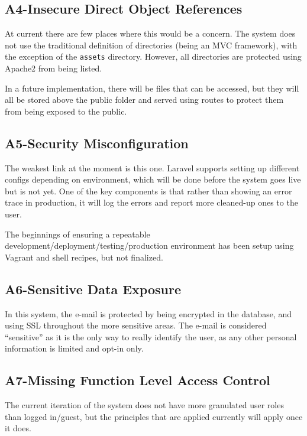 \subsection{A4-Insecure Direct Object References}

At current there are few places where this would be a concern. The
system does not use the traditional definition of directories (being an
MVC framework), with the exception of the \texttt{assets} directory.
However, all directories are protected using Apache2 from being listed.

In a future implementation, there will be files that can be accessed,
but they will all be stored above the public folder and served using
routes to protect them from being exposed to the public.

\subsection{A5-Security Misconfiguration}

The weakest link at the moment is this one. Laravel supports setting up
different configs depending on environment, which will be done before
the system goes live but is not yet. One of the key components is that
rather than showing an error trace in production, it will log the errors
and report more cleaned-up ones to the user.

The beginnings of ensuring a repeatable
development/deployment/testing/production environment has been setup
using Vagrant and shell recipes, but not finalized.

\subsection{A6-Sensitive Data Exposure}

In this system, the e-mail is protected by being encrypted in the
database, and using SSL throughout the more sensitive areas. The e-mail
is considered ``sensitive'' as it is the only way to really identify the
user, as any other personal information is limited and opt-in only.

\subsection{A7-Missing Function Level Access Control}

The current iteration of the system does not have more granulated user
roles than logged in/guest, but the principles that are applied
currently will apply once it does.

